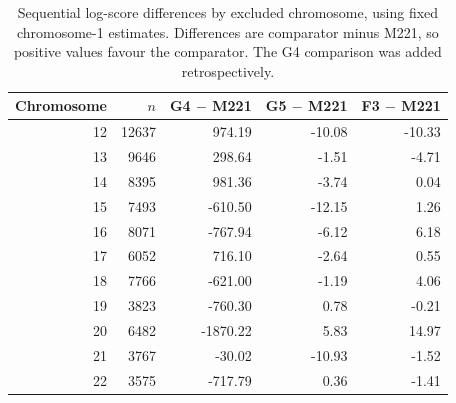 \begin{table}[htbp]
\centering
\small
\caption{Sequential log-score differences by excluded chromosome, using fixed chromosome-1 estimates. Differences are comparator minus M221, so positive values favour the comparator. The G4 comparison was added retrospectively.}
\label{tab:si-genomic-chromosomes}
\begin{tabular}{rrrrr}
\toprule
Chromosome & $n$ & G4 $-$ M221 & G5 $-$ M221 & F3 $-$ M221 \\
\midrule
12 & 12637 & 974.19 & -10.08 & -10.33 \\
13 & 9646 & 298.64 & -1.51 & -4.71 \\
14 & 8395 & 981.36 & -3.74 & 0.04 \\
15 & 7493 & -610.50 & -12.15 & 1.26 \\
16 & 8071 & -767.94 & -6.12 & 6.18 \\
17 & 6052 & 716.10 & -2.64 & 0.55 \\
18 & 7766 & -621.00 & -1.19 & 4.06 \\
19 & 3823 & -760.30 & 0.78 & -0.21 \\
20 & 6482 & -1870.22 & 5.83 & 14.97 \\
21 & 3767 & -30.02 & -10.93 & -1.52 \\
22 & 3575 & -717.79 & 0.36 & -1.41 \\
\bottomrule
\end{tabular}
\end{table}
